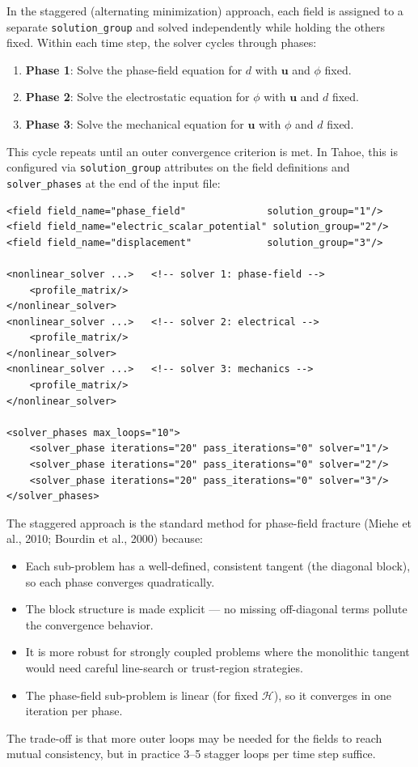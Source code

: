 \documentclass[11pt,a4paper]{article}
\newcommand{\uu}{\bm{u}}
\begin{document}
In the staggered (alternating minimization) approach, each field is assigned to a separate \texttt{solution\_group} and solved independently while holding the others fixed. Within each time step, the solver cycles through phases:
\begin{enumerate}[nosep]
    \item \textbf{Phase 1}: Solve the phase-field equation for $d$ with $\uu$ and $\phi$ fixed.
    \item \textbf{Phase 2}: Solve the electrostatic equation for $\phi$ with $\uu$ and $d$ fixed.
    \item \textbf{Phase 3}: Solve the mechanical equation for $\uu$ with $\phi$ and $d$ fixed.
\end{enumerate}
This cycle repeats until an outer convergence criterion is met. In Tahoe, this is configured via \texttt{solution\_group} attributes on the field definitions and \texttt{solver\_phases} at the end of the input file:
\begin{verbatim}
<field field_name="phase_field"              solution_group="1"/>
<field field_name="electric_scalar_potential" solution_group="2"/>
<field field_name="displacement"             solution_group="3"/>

<nonlinear_solver ...>   <!-- solver 1: phase-field -->
    <profile_matrix/>
</nonlinear_solver>
<nonlinear_solver ...>   <!-- solver 2: electrical -->
    <profile_matrix/>
</nonlinear_solver>
<nonlinear_solver ...>   <!-- solver 3: mechanics -->
    <profile_matrix/>
</nonlinear_solver>

<solver_phases max_loops="10">
    <solver_phase iterations="20" pass_iterations="0" solver="1"/>
    <solver_phase iterations="20" pass_iterations="0" solver="2"/>
    <solver_phase iterations="20" pass_iterations="0" solver="3"/>
</solver_phases>
\end{verbatim}

The staggered approach is the standard method for phase-field fracture (Miehe et al., 2010; Bourdin et al., 2000) because:
\begin{itemize}[nosep]
    \item Each sub-problem has a well-defined, consistent tangent (the diagonal block), so each phase converges quadratically.
    \item The block structure is made explicit --- no missing off-diagonal terms pollute the convergence behavior.
    \item It is more robust for strongly coupled problems where the monolithic tangent would need careful line-search or trust-region strategies.
    \item The phase-field sub-problem is linear (for fixed $\mathcal{H}$), so it converges in one iteration per phase.
\end{itemize}
The trade-off is that more outer loops may be needed for the fields to reach mutual consistency, but in practice 3--5 stagger loops per time step suffice.
\end{document}
